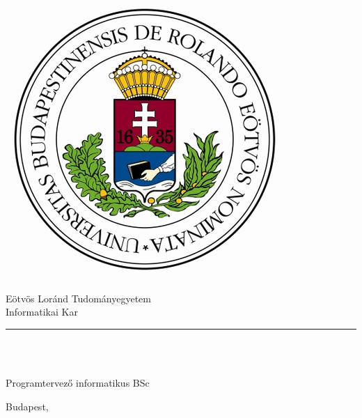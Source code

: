 \begin{titlepage}

\begin{minipage}{0.40\linewidth}
\includegraphics[scale=0.3]{img/elte-cimer}
\end{minipage}
\begin{minipage}{0.50\linewidth}
\begin{center}
Eötvös Loránd Tudományegyetem \\
Informatikai Kar \\
\TANSZEK
\end{center}
\end{minipage}

\hrule
\vfill

\begin{center}
\Huge
\textbf{\CIM}
\normalsize
\end{center}

\vfill

\begin{minipage}[t]{0.5\linewidth}
\begin{flushleft}
\textbf{\TEMAVEZETO} \\
\TEMAVEZETOBEOSZTAS
\end{flushleft}
\end{minipage}
\begin{minipage}[t]{0.5\linewidth}
\begin{flushright}
\textbf{\SZERZO} \\
Programtervező informatikus BSc
\end{flushright}
\end{minipage}

\vfill

\begin{center}
Budapest, \VEDESEVE
\end{center}

\end{titlepage}
